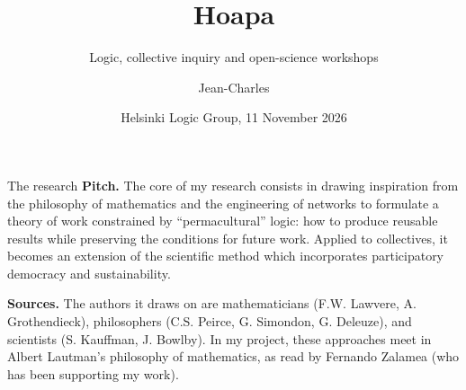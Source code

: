 
\title{Hoapa}
\subtitle{Logic, collective inquiry and open-science workshops}
\author{Jean-Charles}
\date{Helsinki Logic Group, 11 November 2026}

\newcommand{\runinheading}[1]{\textbf{#1.}\enspace}



\maketitle

\begin{frame}[t]{The research}
  \small
  \runinheading{Pitch} The core of my research consists in drawing inspiration from the philosophy of mathematics and the engineering of networks to formulate a theory of work constrained by ``permacultural'' logic: how to produce reusable results while preserving the conditions for future work. Applied to collectives, it becomes an extension of the scientific method which incorporates participatory democracy and sustainability.
  \par\medskip
  \runinheading{Sources} The authors it draws on are mathematicians (F.W. Lawvere, A. Grothendieck), philosophers (C.S. Peirce, G. Simondon, G. Deleuze), and scientists (S. Kauffman, J. Bowlby). In my project, these approaches meet in Albert Lautman’s philosophy of mathematics, as read by Fernando Zalamea (who has been supporting my work).
\end{frame}

